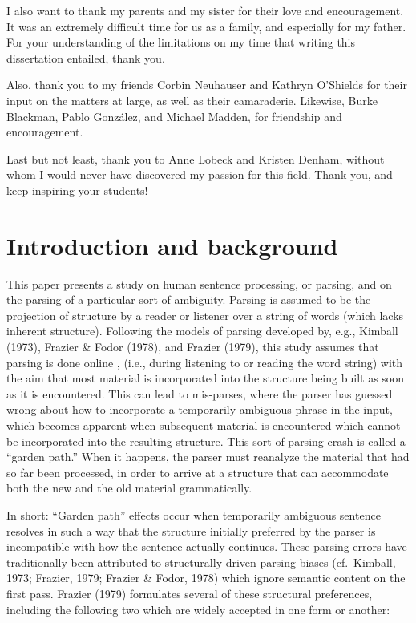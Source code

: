 \documentclass[11pt,oneside]{book}
\begin{document}
I also want to thank my parents and my sister for their love and encouragement. It was an extremely difficult time for us as a family, and especially for my father. For your understanding of the limitations on my time that writing this dissertation entailed, thank you. 

Also, thank you to my friends Corbin Neuhauser and Kathryn O’Shields for their input on the matters at large, as well as their camaraderie. Likewise, Burke Blackman, Pablo Gonz\'{a}lez, and Michael Madden, for friendship and encouragement.

Last but not least, thank you to Anne Lobeck and Kristen Denham, without whom I would never have discovered my passion for this field. Thank you, and keep inspiring your students!

\pagebreak

{
\setcounter{tocdepth}{1}
\tableofcontents
}
\listoftables
\listoffigures
\hypertarget{introduction-and-background}{%
\chapter{Introduction and background}\label{introduction-and-background}}

\setlength\parindent{24pt}\setlength{\parskip}{0.0pt plus 1.0pt}

This paper presents a study on human sentence processing, or parsing, and on the parsing of a particular sort of ambiguity. Parsing is assumed to be the projection of structure by a reader or listener over a string of words (which lacks inherent structure). Following the models of parsing developed by, e.g., Kimball (1973), Frazier \& Fodor (1978), and Frazier (1979), this study assumes that parsing is done online , (i.e., during listening to or reading the word string) with the aim that most material is incorporated into the structure being built as soon as it is encountered. This can lead to mis-parses, where the parser has guessed wrong about how to incorporate a temporarily ambiguous phrase in the input, which becomes apparent when subsequent material is encountered which cannot be incorporated into the resulting structure. This sort of parsing crash is called a ``garden path.'' When it happens, the parser must reanalyze the material that had so far been processed, in order to arrive at a structure that can accommodate both the new and the old material grammatically.

In short: ``Garden path'' effects occur when temporarily ambiguous sentence resolves in such a way that the structure initially preferred by the parser is incompatible with how the sentence actually continues. These parsing errors have traditionally been attributed to structurally-driven parsing biases (cf.~Kimball, 1973; Frazier, 1979; Frazier \& Fodor, 1978) which ignore semantic content on the first pass. Frazier (1979) formulates several of these structural preferences, including the following two which are widely accepted in one form or another:
\end{document}
